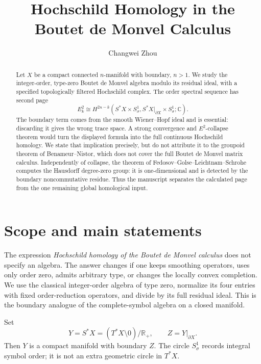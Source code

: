 \documentclass[11pt,oneside,reqno]{article}
\title{Hochschild Homology in the\\
Boutet de Monvel Calculus}
\author{Changwei Zhou}
\date{}
\newcommand{\C}{\mathbb C}
\theoremstyle{plain}
\theoremstyle{definition}
\theoremstyle{remark}
\begin{document}
\hypersetup{pageanchor=false}
\maketitle
\thispagestyle{empty}
\clearpage
\hypersetup{pageanchor=true}
\tableofcontents
\clearpage
\listoffigures
\clearpage
{}
\setcounter{page}{1}

\begin{abstract}
Let \(X\) be a compact connected \(n\)-manifold with boundary, \(n>1\).
We study the integer-order, type-zero Boutet de Monvel algebra modulo its
residual ideal, with a specified topologically filtered Hochschild complex.
The order spectral sequence has second page
\[
 E^2_k\cong
 H^{2n-k}(S^*X\times S^1_\sigma,
 S^*X|_{\partial X}\times S^1_\sigma;\C).
\]
The boundary term comes from the smooth Wiener--Hopf ideal and is essential:
discarding it gives the wrong trace space. A strong convergence and
\(E^2\)-collapse theorem would turn the displayed formula into the full
continuous Hochschild homology. We state that implication precisely, but do
not attribute it to the groupoid theorem of Benameur--Nistor, which does not
cover the full Boutet de Monvel matrix calculus. Independently of collapse,
the theorem of Fedosov--Golse--Leichtnam--Schrohe computes the Hausdorff
degree-zero group: it is one-dimensional and is detected by the boundary
noncommutative residue. Thus the manuscript separates the calculated page
from the one remaining global homological input.
\end{abstract}

\section{Scope and main statements}

The expression \emph{Hochschild homology of the Boutet de Monvel calculus}
does not specify an algebra. The answer changes if one keeps smoothing
operators, uses only order zero, admits arbitrary type, or changes the
locally convex completion. We use the classical integer-order algebra of
type zero, normalize its four entries with fixed order-reduction operators,
and divide by its full residual
ideal. This is the boundary analogue of the complete-symbol algebra on a
closed manifold.

Set
\[
 Y=S^*X=(T^*X\setminus0)/\mathbb R_+,
 \qquad Z=Y|_{\partial X}.
\]
Then \(Y\) is a compact manifold with boundary \(Z\). The circle
\(S^1_\sigma\) records integral symbol order; it is not an extra geometric
circle in \(T^*X\).
\end{document}

